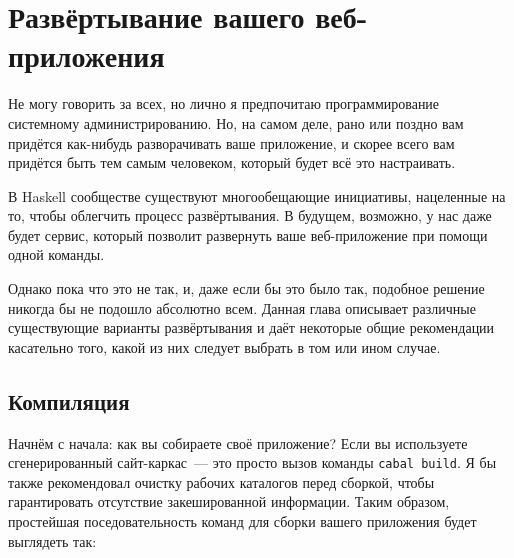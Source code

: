 \chapter{Развёртывание вашего веб-приложения}\label{chap:deploying}
%
%

Не могу говорить за всех, но лично я предпочитаю программирование системному администрированию. Но, на самом деле, рано или поздно вам придётся как-нибудь разворачивать ваше приложение, и скорее всего вам придётся быть тем самым человеком, который будет всё это настраивать.

%
В Haskell сообществе существуют многообещающие инициативы, нацеленные на то, чтобы облегчить процесс развёртывания. В будущем, возможно, у нас даже будет сервис, который позволит развернуть ваше веб-приложение при помощи одной команды.

%
Однако пока что это не так, и, даже если бы это было так, подобное решение никогда бы не подошло абсолютно всем. Данная глава описывает различные существующие варианты развёртывания и даёт некоторые общие рекомендации касательно того, какой из них следует выбрать в том или ином случае.

\section{Компиляция}
%
%
Начнём с начала: как вы собираете своё приложение? Если вы используете сгенерированный сайт-каркас~--- это просто вызов команды \lstinline{cabal build}. Я бы также рекомендовал очистку рабочих каталогов перед сборкой, чтобы гарантировать отсутствие закешированной информации. Таким образом, простейшая поседовательность команд для сборки вашего приложения будет выглядеть так:

